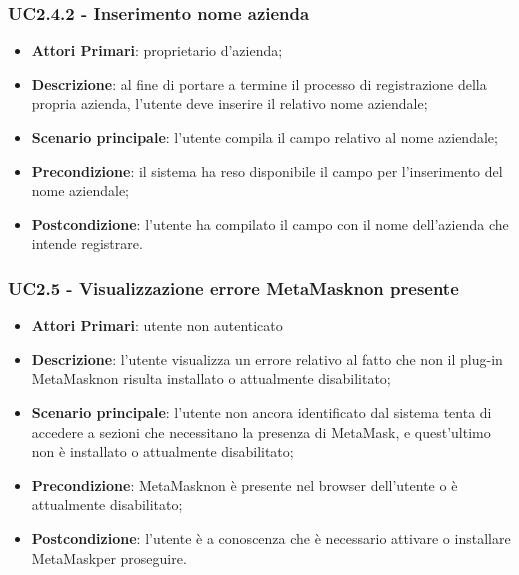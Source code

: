 \subsubsection{UC2.4.2 - Inserimento nome azienda}
\begin{itemize}
	\item \textbf{Attori Primari}: proprietario d'azienda;
	\item \textbf{Descrizione}: al fine di portare a termine il processo di registrazione della propria azienda, l'utente deve inserire il relativo nome aziendale;
	\item \textbf{Scenario principale}: l'utente compila il campo relativo al nome aziendale;
	\item \textbf{Precondizione}: il sistema ha reso disponibile il campo per l'inserimento del nome aziendale;
	\item \textbf{Postcondizione}: l'utente ha compilato il campo con il nome dell'azienda che intende registrare.
\end{itemize}



\subsubsection{UC2.5 - Visualizzazione errore MetaMask\glosp non presente}
\begin{itemize}
	\item \textbf{Attori Primari}: utente non autenticato
	\item \textbf{Descrizione}: l'utente visualizza un errore relativo al fatto che non il plug-in MetaMask\glosp non risulta installato o attualmente disabilitato;
	\item \textbf{Scenario principale}: l'utente non ancora identificato dal sistema tenta di accedere a sezioni che necessitano la presenza di MetaMask\glosp, e quest'ultimo non è installato o attualmente disabilitato;
	\item \textbf{Precondizione}: MetaMask\glosp non è presente nel browser dell'utente o è attualmente disabilitato;
	\item \textbf{Postcondizione}: l'utente è a conoscenza che è necessario attivare o installare MetaMask\glosp per proseguire.
	
\end{itemize}

